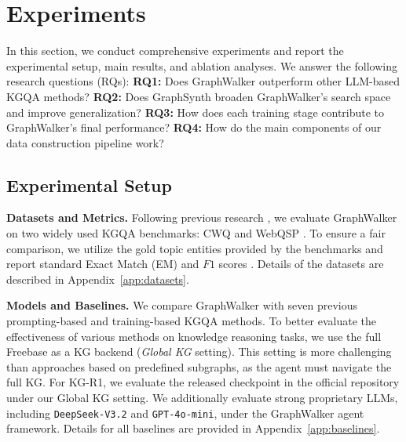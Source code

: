 \section{Experiments}

In this section, we conduct comprehensive experiments and report the experimental setup, main results, and ablation analyses. 
We answer the following research questions (RQs):
\textbf{RQ1:} Does GraphWalker outperform other LLM-based KGQA methods?
\textbf{RQ2:} Does GraphSynth broaden GraphWalker's search space and improve generalization?
\textbf{RQ3:} How does each training stage contribute to GraphWalker's final performance?
\textbf{RQ4:} How do the main components of our data construction pipeline work?



\subsection{Experimental Setup}

\textbf{Datasets and Metrics.}
Following previous research \citep{sun2023think,luo2023reasoning}, we evaluate GraphWalker on two widely used KGQA benchmarks: CWQ \citep{talmor2018webknowledgebaseansweringcomplex} and WebQSP \citep{Yih2016TheVO}. To ensure a fair comparison, we utilize the gold topic entities provided by the benchmarks and report standard Exact Match (EM) and $F1$ scores \citep{talmor2018webknowledgebaseansweringcomplex}. Details of the datasets are described in Appendix~\ref{app:datasets}.



\textbf{Models and Baselines.}
We compare GraphWalker with seven previous prompting-based and training-based KGQA methods. 
To better evaluate the effectiveness of various methods on knowledge reasoning tasks, we use the full Freebase as a KG backend (\textit{Global KG} setting).
This setting is more challenging than approaches based on predefined subgraphs, as the agent must navigate the full KG.
For KG-R1, we evaluate the released checkpoint in the official repository under our Global KG setting. 
We additionally evaluate strong proprietary LLMs, including \texttt{DeepSeek-V3.2} and \texttt{GPT-4o-mini}, under the GraphWalker agent framework.
Details for all baselines are provided in Appendix~\ref{app:baselines}. 


